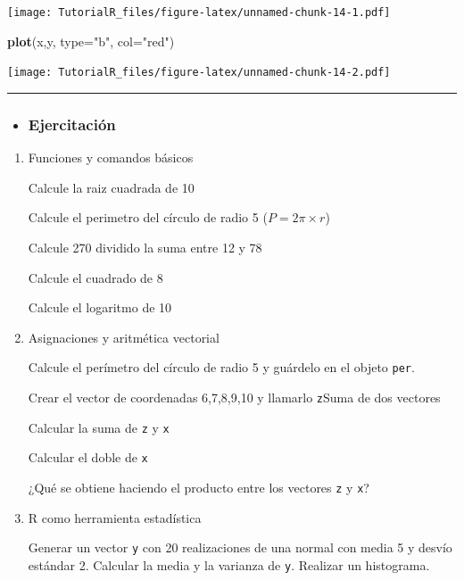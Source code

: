\documentclass[]{book}
\newenvironment{Shaded}{\begin{snugshade}}{\end{snugshade}}
\newcommand{\KeywordTok}[1]{\textcolor[rgb]{0.13,0.29,0.53}{\textbf{#1}}}
\newcommand{\DataTypeTok}[1]{\textcolor[rgb]{0.13,0.29,0.53}{#1}}
\newcommand{\StringTok}[1]{\textcolor[rgb]{0.31,0.60,0.02}{#1}}
\newcommand{\NormalTok}[1]{#1}
\newenvironment{rmdblock}[1]
{\begin{shaded*}
		\begin{itemize}
			\renewcommand{\labelitemi}{
				\raisebox{-.7\height}[0pt][0pt]{
					{\setkeys{Gin}{width=3em,keepaspectratio}\texttt{[image: images/\#1]}}
				}
			}
			\item
		}
		{
		\end{itemize}
	\end{shaded*}
}
\newenvironment{rmdtip}
{\begin{rmdblock}{tip}}
	{\end{rmdblock}}
\begin{document}
\texttt{[image: TutorialR\_files/figure-latex/unnamed-chunk-14-1.pdf]}

\begin{Shaded}
\begin{Highlighting}[]
\KeywordTok{plot}\NormalTok{(x,y, }\DataTypeTok{type=}\StringTok{"b"}\NormalTok{, }\DataTypeTok{col=}\StringTok{"red"}\NormalTok{)}
\end{Highlighting}
\end{Shaded}

\texttt{[image: TutorialR\_files/figure-latex/unnamed-chunk-14-2.pdf]}

\begin{center}\rule{0.5\linewidth}{\linethickness}\end{center}

\begin{rmdtip}
\hypertarget{ejercitacion}{%
\subsubsection{Ejercitación}\label{ejercitacion}}
\end{rmdtip}

\begin{boxeda}
\begin{enumerate}
\def\labelenumi{\arabic{enumi}.}
\item
  Funciones y comandos básicos

  Calcule la raiz cuadrada de 10

  Calcule el perimetro del círculo de radio 5 (\(P = 2\pi \times r\))

  Calcule 270 dividido la suma entre 12 y 78

  Calcule el cuadrado de 8

  Calcule el logaritmo de 10
\item
  Asignaciones y aritmética vectorial

  Calcule el perímetro del círculo de radio 5 y guárdelo en el objeto
  \texttt{per}.

  Crear el vector de coordenadas 6,7,8,9,10 y llamarlo \texttt{z}Suma de
  dos vectores

  Calcular la suma de \texttt{z} y \texttt{x}

  Calcular el doble de \texttt{x}

  ¿Qué se obtiene haciendo el producto entre los vectores \texttt{z} y
  \texttt{x}?
\item
  R como herramienta estadística

  Generar un vector \texttt{y} con 20 realizaciones de una normal con
  media 5 y desvío estándar 2. Calcular la media y la varianza de
  \texttt{y}. Realizar un histograma.
\end{enumerate}
\end{boxeda}
\end{document}
